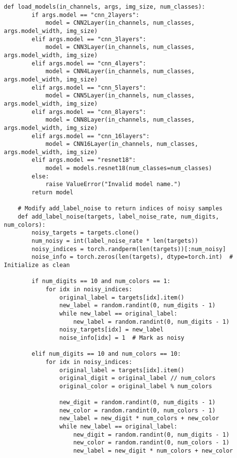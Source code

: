 \begin{lstlisting}[style=pythonstyle, caption={Program Example}]
    def load_models(in_channels, args, img_size, num_classes):
        if args.model == "cnn_2layers":
            model = CNN2Layer(in_channels, num_classes, args.model_width, img_size)
        elif args.model == "cnn_3layers":
            model = CNN3Layer(in_channels, num_classes, args.model_width, img_size)
        elif args.model == "cnn_4layers":
            model = CNN4Layer(in_channels, num_classes, args.model_width, img_size)
        elif args.model == "cnn_5layers":
            model = CNN5Layer(in_channels, num_classes, args.model_width, img_size)
        elif args.model == "cnn_8layers":
            model = CNN8Layer(in_channels, num_classes, args.model_width, img_size)
        elif args.model == "cnn_16layers":
            model = CNN16Layer(in_channels, num_classes, args.model_width, img_size)
        elif args.model == "resnet18":
            model = models.resnet18(num_classes=num_classes)
        else:
            raise ValueError("Invalid model name.")
        return model
    
    # Modify add_label_noise to return indices of noisy samples
    def add_label_noise(targets, label_noise_rate, num_digits, num_colors):
        noisy_targets = targets.clone()
        num_noisy = int(label_noise_rate * len(targets))
        noisy_indices = torch.randperm(len(targets))[:num_noisy]
        noise_info = torch.zeros(len(targets), dtype=torch.int)  # Initialize as clean
    
        if num_digits == 10 and num_colors == 1:
            for idx in noisy_indices:
                original_label = targets[idx].item()
                new_label = random.randint(0, num_digits - 1)
                while new_label == original_label:
                    new_label = random.randint(0, num_digits - 1)
                noisy_targets[idx] = new_label
                noise_info[idx] = 1  # Mark as noisy
    
        elif num_digits == 10 and num_colors == 10:
            for idx in noisy_indices:
                original_label = targets[idx].item()
                original_digit = original_label // num_colors
                original_color = original_label % num_colors
    
                new_digit = random.randint(0, num_digits - 1)
                new_color = random.randint(0, num_colors - 1)
                new_label = new_digit * num_colors + new_color
                while new_label == original_label:
                    new_digit = random.randint(0, num_digits - 1)
                    new_color = random.randint(0, num_colors - 1)
                    new_label = new_digit * num_colors + new_color
    

\end{lstlisting}
